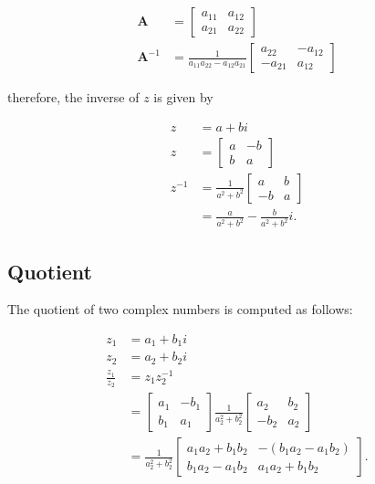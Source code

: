 $$
\begin{aligned}
\mathbf{A} & =\left[\begin{array}{ll}
a_{11} & a_{12} \\
a_{21} & a_{22}
\end{array}\right] \\
\mathbf{A}^{-1} & =\frac{1}{a_{11} a_{22}-a_{12} a_{21}}\left[\begin{array}{cc}
a_{22} & -a_{12} \\
-a_{21} & a_{12}
\end{array}\right]
\end{aligned}
$$

therefore, the inverse of $z$ is given by

$$
\begin{aligned}
z & =a+b i \\
z & =\left[\begin{array}{cc}
a & -b \\
b & a
\end{array}\right] \\
z^{-1} & =\frac{1}{a^{2}+b^{2}}\left[\begin{array}{cc}
a & b \\
-b & a
\end{array}\right] \\
& =\frac{a}{a^{2}+b^{2}}-\frac{b}{a^{2}+b^{2}} i .
\end{aligned}
$$

\subsection{Quotient}
The quotient of two complex numbers is computed as follows:

$$
\begin{aligned}
z_{1} & =a_{1}+b_{1} i \\
z_{2} & =a_{2}+b_{2} i \\
\frac{z_{1}}{z_{2}} & =z_{1} z_{2}^{-1} \\
& =\left[\begin{array}{cc}
a_{1} & -b_{1} \\
b_{1} & a_{1}
\end{array}\right] \frac{1}{a_{2}^{2}+b_{2}^{2}}\left[\begin{array}{cc}
a_{2} & b_{2} \\
-b_{2} & a_{2}
\end{array}\right] \\
& =\frac{1}{a_{2}^{2}+b_{2}^{2}}\left[\begin{array}{cc}
a_{1} a_{2}+b_{1} b_{2} & -\left(b_{1} a_{2}-a_{1} b_{2}\right) \\
b_{1} a_{2}-a_{1} b_{2} & a_{1} a_{2}+b_{1} b_{2}
\end{array}\right] .
\end{aligned}
$$


